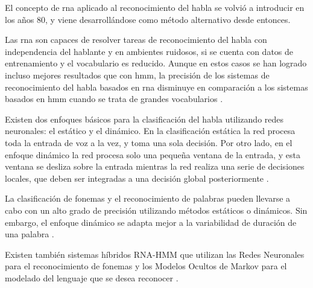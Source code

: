 El concepto de \gls{rna} aplicado al reconocimiento del habla se volvi\'o a introducir en los a\~nos 80,
y viene desarroll\'andose como m\'etodo alternativo desde entonces. 

Las \gls{rna} son capaces de resolver tareas de reconocimiento del habla con independencia del hablante 
y en ambientes ruidosos, si se cuenta con datos de entrenamiento y el vocabulario es reducido.
Aunque en estos casos se han logrado incluso mejores resultados que con \gls{hmm},
la precisión de los sistemas de reconocimiento del habla basados en \gls{rna} disminuye en comparación
a los sistemas basados en \gls{hmm} cuando se trata de grandes vocabularios \cite{VimalaReview2012}.

Existen dos enfoques b\'asicos para la clasificaci\'on del habla utilizando redes neuronales: 
el est\'atico y el din\'amico. En la clasificaci\'on est\'atica la red procesa toda la entrada de voz
a la vez, y toma una sola decisi\'on. Por otro lado, en el enfoque din\'amico la red procesa 
solo una peque\~na ventana de la entrada, y esta ventana se desliza sobre la entrada mientras 
la red realiza una serie de decisiones locales, que deben ser integradas a una decisi\'on global 
posteriormente \cite{TebelskisSpeech1995}.

La clasificaci\'on de fonemas y el reconocimiento de palabras pueden llevarse a cabo con un alto
grado de precisi\'on utilizando m\'etodos est\'aticos o din\'amicos. Sin embargo, 
el enfoque din\'amico se adapta mejor a la variabilidad de duraci\'on de una 
palabra \cite{TebelskisSpeech1995}.

Existen tambi\'en sistemas h\'ibridos RNA-HMM que utilizan las Redes Neuronales para el reconocimiento de
fonemas y los Modelos Ocultos de Markov para el modelado del lenguaje que se desea 
reconocer \cite{VimalaReview2012}.
